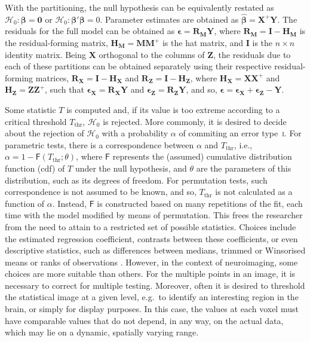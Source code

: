 With the partitioning, the null hypothesis can be equivalently restated as $\mathcal{H}_0 : \boldsymbol{\beta}=\mathbf{0}$ or $\mathcal{H}_0 : \boldsymbol{\beta}'\boldsymbol{\beta}=0$. Parameter estimates are obtained as $\boldsymbol{\hat{\beta}}=\mathbf{X}^{+}\mathbf{Y}$. The residuals for the full model can be obtained as $\boldsymbol{\epsilon} = \mathbf{R}_{\mathbf{M}}\mathbf{Y}$, where $\mathbf{R}_{\mathbf{M}}=\mathbf{I}-\mathbf{H}_{\mathbf{M}}$ is the residual-forming matrix, $\mathbf{H}_{\mathbf{M}}=\mathbf{M}\mathbf{M}^{+}$ is the hat matrix, and $\mathbf{I}$ is the $n \times n$ identity matrix. Being $\mathbf{X}$ orthogonal to the columns of $\mathbf{Z}$, the residuals due to each of these partitions can be obtained separately using their respective residual-forming matrices, $\mathbf{R}_{\mathbf{X}}=\mathbf{I}-\mathbf{H}_{\mathbf{X}}$ and $\mathbf{R}_{\mathbf{Z}}=\mathbf{I}-\mathbf{H}_{\mathbf{Z}}$, where $\mathbf{H}_{\mathbf{X}} = \mathbf{X}\mathbf{X}^{+}$ and $\mathbf{H}_{\mathbf{Z}} = \mathbf{Z}\mathbf{Z}^{+}$, such that $\boldsymbol{\epsilon}_{\mathbf{X}} = \mathbf{R}_{\mathbf{X}}\mathbf{Y}$ and $\boldsymbol{\epsilon}_{\mathbf{Z}} = \mathbf{R}_{\mathbf{Z}}\mathbf{Y}$, and so, $\boldsymbol{\epsilon} = \boldsymbol{\epsilon}_{\mathbf{X}} + \boldsymbol{\epsilon}_{\mathbf{Z}} - \mathbf{Y}$.

Some statistic $T$ is computed and, if its value is too extreme according to a critical threshold $T_{\text{thr}}$, $\mathcal{H}_0$ is rejected. More commonly, it is desired to decide about the rejection of $\mathcal{H}_0$ with a probability $\alpha$ of commiting an error type~\textsc{i}. For parametric tests, there is a correspondence between $\alpha$ and $T_{\text{thr}}$, i.e., $\alpha = 1-\mathsf{F}(T_{\text{thr}};\theta)$, where $\mathsf{F}$ represents the (assumed) cumulative distribution function (cdf) of $T$ under the null hypothesis, and $\theta$ are the parameters of this distribution, such as its degrees of freedom. For permutation tests, such correspondence is not assumed to be known, and so, $T_{\text{thr}}$ is not calculated as a function of $\alpha$. Instead, $\mathsf{F}$ is constructed based on many repetitions of the fit, each time with the model modified by means of permutation. This frees the researcher from the need to attain to a restricted set of possible statistics. Choices include the estimated regression coefficient, contrasts between these coefficients, or even descriptive statistics, such as differences between medians, trimmed or Winsorised means or ranks of observations \citep{Ernst2004}. However, in the context of neuroimaging, some choices are more suitable than others. For the multiple points in an image, it is necessary to correct for multiple testing. Moreover, often it is desired to threshold the statistical image at a given level, e.g.\ to identify an interesting region in the brain, or simply for display purposes. In this case, the values at each voxel must have comparable values that do not depend, in any way, on the actual data, which may lie on a dynamic, spatially varying range.

